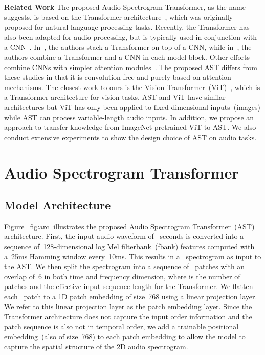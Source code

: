 \documentclass[a4paper]{article}
\begin{document}
\textbf{Related Work} The proposed Audio Spectrogram Transformer, as the name suggests, is based on the Transformer architecture~\cite{vaswani2017attention}, which was originally proposed for natural language processing tasks. Recently, the Transformer has also been adapted for audio processing, but is typically used in conjunction with a CNN~\cite{miyazaki2020convolution,kong2020sound,gulati2020conformer}. In~\cite{miyazaki2020convolution,kong2020sound}, the authors stack a Transformer on top of a CNN, while in~\cite{gulati2020conformer}, the authors combine a Transformer and a CNN in each model block. Other efforts combine CNNs with simpler attention modules~\cite{gong2021psla,kong2020panns,rybakov2020streaming}. The proposed AST differs from these studies in that it is convolution-free and purely based on attention mechanisms. The closest work to ours is the Vision Transformer~(ViT)~\cite{dosovitskiy2021image,touvron2020deit,yuan2021tokens}, which is a Transformer architecture for vision tasks. AST and ViT have similar architectures but ViT has only been applied to fixed-dimensional inputs~(images) while AST can process variable-length audio inputs. In addition, we propose an approach to transfer knowledge from ImageNet pretrained ViT to AST. We also conduct extensive experiments to show the design choice of AST on audio tasks. 


\section{Audio Spectrogram Transformer}
\subsection{Model Architecture}
\label{sec:arc}

Figure~\ref{fig:arc} illustrates the proposed Audio Spectrogram Transformer~(AST) architecture.
First, the input audio waveform of~ seconds is converted into a sequence of~128-dimensional log Mel filterbank~(fbank) features computed with a~25ms Hamming window every~10ms.
This results in a~ spectrogram as input to the AST.
We then split the spectrogram into a sequence of~  patches with an overlap of~6 in both time and frequency dimension, where  is the number of patches and the effective input sequence length for the Transformer.
We flatten each~ patch to a 1D patch embedding of size~768 using a linear projection layer.
We refer to this linear projection layer as the patch embedding layer.
Since the Transformer architecture does not capture the input order information and the patch sequence is also not in temporal order, we add a trainable positional embedding~(also of size~768) to each patch embedding to allow the model to capture the spatial structure of the 2D audio spectrogram.
\end{document}
